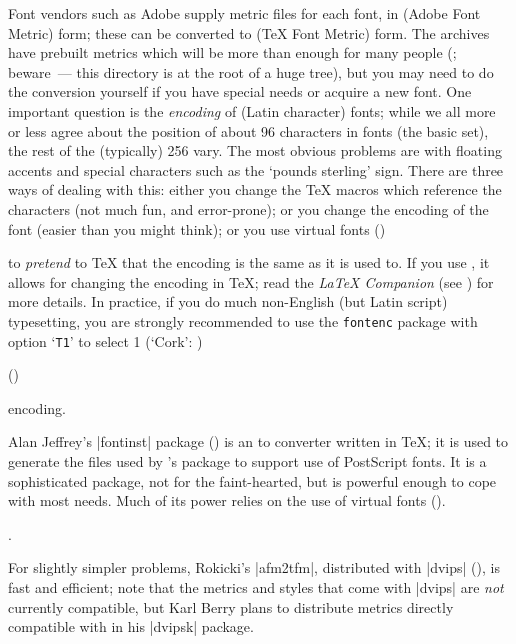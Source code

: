 Font vendors such as Adobe supply metric files for each font, in 
(Adobe Font Metric) form; these can be converted to 
(\TeX{} Font Metric) form. The  archives have prebuilt metrics
which will be more than enough for many people (;
beware~--- this directory is at the root of a huge tree), but you may
need to do the conversion yourself if you have special needs or
acquire a new font. One important question is the \emph{encoding} of
(Latin character) fonts; while we all more or less agree about the
position of about 96 characters in fonts (the basic  set), the
rest of the (typically) 256 vary. The most obvious problems are with
floating accents and special characters such as the `pounds sterling'
sign. There are three ways of dealing with this: either you change the
\TeX{} macros which reference the characters (not much fun, and
error-prone); or you change the encoding of the font (easier than you
might think); or you use
\htmlignore
virtual fonts ()
\endhtmlignore
\begin{htmlversion}
\end{htmlversion}
to \emph{pretend} to
\TeX{} that the encoding is the same as it is used to. If you use
\LaTeXe{}, it allows for changing the encoding in \TeX{}; read the
\emph{\LaTeX{} Companion}
(see ) for more details. 
In practice, if you do much non-English (but Latin script)
typesetting, you are strongly recommended to use the \texttt{fontenc}
package with option `\texttt{T1}' to select 1
\htmlignore
  (`Cork': )
\endhtmlignore
\begin{htmlversion}
  ()
\end{htmlversion}
encoding. 

Alan Jeffrey's \ProgName|fontinst| package () is an
 to  converter written in \TeX{}; it is used to
generate the
files used by \LaTeXe{}'s  package 
to support use of PostScript fonts. It is a sophisticated package, not
for the faint-hearted, but is powerful enough to cope with most needs.
Much of its power relies on the use of
\htmlignore
virtual fonts ().
\endhtmlignore
\begin{htmlversion}
.
\end{htmlversion}

For slightly simpler problems, Rokicki's \ProgName|afm2tfm|,
distributed with \ProgName|dvips| (), is fast and
efficient; note that the metrics and styles that come with
\ProgName|dvips| are \emph{not} currently \LaTeXe{} compatible, but
Karl Berry plans to distribute metrics directly compatible with 
in his \ProgName|dvipsk| package.

